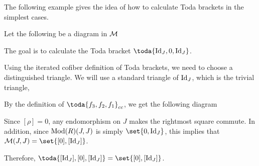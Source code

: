 The following example gives the idea of how to calculate Toda brackets in the simplest cases.

\begin{example}
	Let the following be a diagram in \( {\mathcal{M}} \)
	\begin{center}
	\end{center}
	
	The goal is to calculate the Toda bracket \( \toda{\Id_J, 0, \Id_J} \).

	Using the iterated cofiber definition of Toda brackets, we need to choose a distinguished triangle. We will use a standard triangle of \( \operatorname{Id}_J \), which is the trivial triangle,
	\begin{center}
	\end{center}

	By the definition of \( \toda{f_3, f_2, f_1}_{cc} \), we get the following diagram
	\begin{center}
	\end{center}

	Since \( [\rho] = 0 \), any endomorphism on \( J \) makes the rightmost square commute. In addition, since \( \operatorname{Mod}(R)(J, J) \) is simply \( \set{0, \Id_J} \), this implies that \( \Mc(J, J) = \set{[0], [\Id_J]} \).

	Therefore, \( \toda{[\Id_J], [0], [\Id_J]} = \set{[0], [\Id_J]} \).
\end{example}

